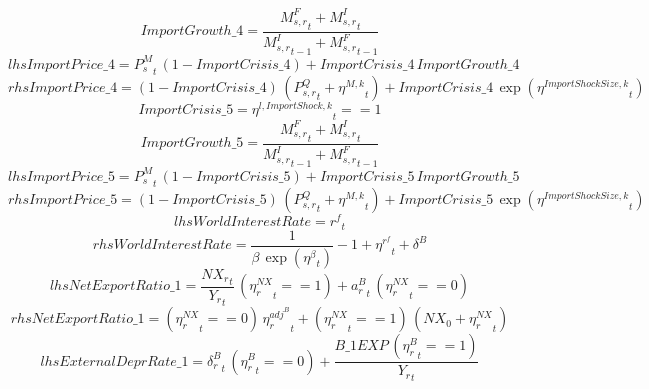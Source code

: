 \begin{dmath*}
ImportGrowth\_4 = \frac{{{M^F_{s,r}}}_{t}+{{M^I_{s,r}}}_{t}}{{{M^I_{s,r}}}_{t-1}+{{M^F_{s,r}}}_{t-1}}
\end{dmath*}
\begin{dmath*}
lhsImportPrice\_4 = {{P^{M}_s}}_{t}\, \left(1-{ImportCrisis\_4}\right)+{ImportCrisis\_4}\, {ImportGrowth\_4}
\end{dmath*}
\begin{dmath*}
rhsImportPrice\_4 = \left(1-{ImportCrisis\_4}\right)\, \left({{P^Q_{s,r}}}_{t}+{{\eta^{M,k}}}_{t}\right)+{ImportCrisis\_4}\, \exp\left({{\eta^{Import Shock Size,k}}}_{t}\right)
\end{dmath*}
\begin{dmath*}
ImportCrisis\_5 = {{\eta^{l,Import Shock,k}}}_{t}==1
\end{dmath*}
\begin{dmath*}
ImportGrowth\_5 = \frac{{{M^F_{s,r}}}_{t}+{{M^I_{s,r}}}_{t}}{{{M^I_{s,r}}}_{t-1}+{{M^F_{s,r}}}_{t-1}}
\end{dmath*}
\begin{dmath*}
lhsImportPrice\_5 = {{P^{M}_s}}_{t}\, \left(1-{ImportCrisis\_5}\right)+{ImportCrisis\_5}\, {ImportGrowth\_5}
\end{dmath*}
\begin{dmath*}
rhsImportPrice\_5 = \left(1-{ImportCrisis\_5}\right)\, \left({{P^Q_{s,r}}}_{t}+{{\eta^{M,k}}}_{t}\right)+{ImportCrisis\_5}\, \exp\left({{\eta^{Import Shock Size,k}}}_{t}\right)
\end{dmath*}
\begin{dmath*}
lhsWorldInterestRate = {{r^{f}}}_{t}
\end{dmath*}
\begin{dmath*}
rhsWorldInterestRate = \frac{1}{{{\beta}}\, \exp\left({{\eta^{\beta}}}_{t}\right)}-1+{{\eta^{r^f}}}_{t}+{{\delta^B}}
\end{dmath*}
\begin{dmath*}
lhsNetExportRatio\_1 = \frac{{{NX_r}}_{t}}{{{Y_r}}_{t}}\, \left({{\eta^{NX}_r}}_{t}==1\right)+{a^B_r}_{t}\, \left({{\eta^{NX}_r}}_{t}==0\right)
\end{dmath*}
\begin{dmath*}
rhsNetExportRatio\_1 = \left({{\eta^{NX}_r}}_{t}==0\right)\, {{\eta^{adj^B}_r}}_{t}+\left({{\eta^{NX}_r}}_{t}==1\right)\, \left({{NX_0}}+{{\eta^{NX}_r}}_{t}\right)
\end{dmath*}
\begin{dmath*}
lhsExternalDeprRate\_1 = {{\delta^{B}_r}}_{t}\, \left({{\eta^{B}_r}}_{t}==0\right)+\frac{{B\_1EXP}\, \left({{\eta^{B}_r}}_{t}==1\right)}{{{Y_r}}_{t}}
\end{dmath*}
